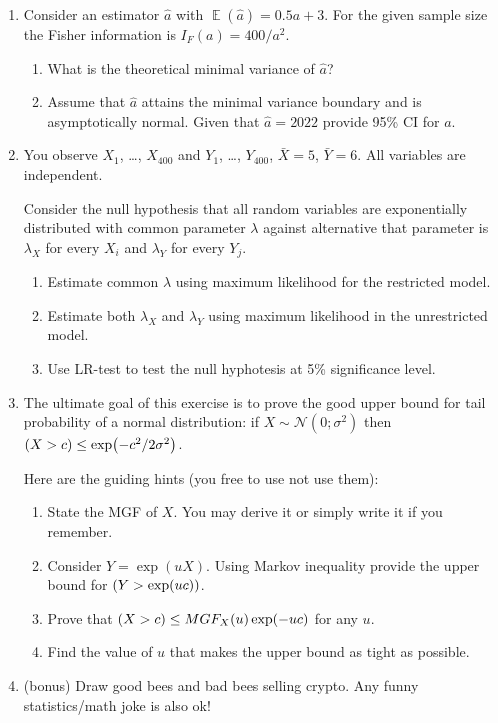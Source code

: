 \documentclass[12pt]{article}
\let\P\relax
\DeclareMathOperator{\P}{\mathbb{P}}
\DeclareMathOperator{\E}{\mathbb{E}}
\newcommand \cN{\mathcal{N}}
\begin{document}
\begin{enumerate}
\item Consider an estimator $\hat a$ with $\E(\hat a) = 0.5a + 3$. For the given sample size the Fisher information is $I_F(a) = 400/a^2$.
\begin{enumerate}
	\item What is the theoretical minimal variance of $\hat a$?
	\item Assume that $\hat a$ attains the minimal variance boundary and is asymptotically normal. Given that $\hat a = 2022$ provide 95\% CI for $a$.
\end{enumerate}

\item You observe $X_1$, \ldots, $X_{400}$ and $Y_1$, \ldots, $Y_{400}$, $\bar X = 5$, $\bar Y = 6$. 
All variables are independent. 

Consider the null hypothesis that all random variables are exponentially distributed with common parameter $\lambda$ against alternative
that parameter is $\lambda_X$ for every $X_i$ and $\lambda_Y$ for every $Y_j$. 

\begin{enumerate}
	\item Estimate common $\lambda$ using maximum likelihood for the restricted model. 
	\item Estimate both $\lambda_X$ and $\lambda_Y$ using maximum likelihood in the unrestricted model. 
	\item Use LR-test to test the null hyphotesis at 5\% significance level. 
\end{enumerate}

\item The ultimate goal of this exercise is to prove the good upper bound for tail probability of a normal distribution: 
if $X\sim \cN(0; \sigma^2)$ then $\P(X > c) \leq \exp(-c^2/2\sigma^2)$.

Here are the guiding hints (you free to use not use them): 

\begin{enumerate}
	\item State the MGF of $X$. You may derive it or simply write it if you remember.
	\item Consider $Y = \exp(uX)$. Using Markov inequality provide the upper bound for $\P(Y > \exp(uc))$.
	\item Prove that $\P(X > c) \leq MGF_X(u)\exp(-uc)$ for any $u$.
	\item Find the value of $u$ that makes the upper bound as tight as possible. 
\end{enumerate}


\item (bonus) Draw good bees and bad bees selling crypto. Any funny statistics/math joke is also ok!

\end{enumerate}
\end{document}
